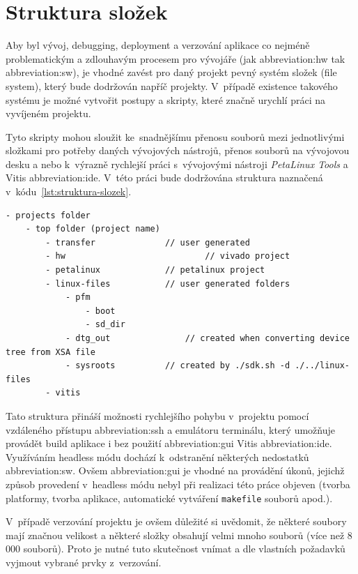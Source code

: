 \documentclass[a4paper, twoside, 11pt]{article}
\begin{document}
	\section{Struktura složek}\label{sec:struktura-slozek}
		Aby byl vývoj, debugging, deployment a verzování aplikace co nejméně problematickým a zdlouhavým procesem pro vývojáře (jak \gls{abbreviation:hw} tak \gls{abbreviation:sw}), je vhodné zavést pro daný projekt pevný systém složek (file system), který bude dodržován napříč projekty. V~případě existence takového systému je možné vytvořit postupy a skripty, které značně urychlí práci na vyvíjeném projektu.\par
		Tyto skripty mohou sloužit ke~snadnějšímu přenosu souborů mezi jednotlivými složkami pro potřeby daných vývojových nástrojů, přenos souborů na vývojovou desku a nebo k~výrazně rychlejší práci s~vývojovými nástroji \textit{PetaLinux Tools} a Vitis \gls{abbreviation:ide}.
		V~této práci bude dodržována struktura naznačená v~kódu~\ref{lst:struktura-slozek}.

		\begin{lstlisting}[language={Text}, caption={Struktura složek, využívaná při tvorbě projektů k~dosažení lepšího \gls{abbreviation:dx}.}, label= {lst:struktura-slozek}]
- projects folder
	- top folder (project name)
		- transfer				// user generated
		- hw							// vivado project
		- petalinux				// petalinux project
		- linux-files			// user generated folders
			- pfm
				- boot
				- sd_dir
			- dtg_out				// created when converting device tree from XSA file
			- sysroots			// created by ./sdk.sh -d ./../linux-files
		- vitis\end{lstlisting}

		Tato struktura přináší možnosti rychlejšího pohybu v~projektu pomocí vzdáleného přístupu \gls{abbreviation:ssh} a emulátoru terminálu, který umožňuje provádět build aplikace i bez použití \gls{abbreviation:gui} Vitis \gls{abbreviation:ide}. Využíváním headless módu dochází k~odstranění některých nedostatků \gls{abbreviation:sw}. Ovšem \gls{abbreviation:gui} je vhodné na provádění úkonů, jejichž způsob provedení v~headless módu nebyl při realizaci této práce objeven (tvorba platformy, tvorba aplikace, automatické vytváření \texttt{makefile} souborů apod.).\par
		V~případě verzování projektu je ovšem důležité si uvědomit, že některé soubory mají značnou velikost a některé složky obsahují velmi mnoho souborů (více než 8 000 souborů). Proto je nutné tuto skutečnost vnímat a dle vlastních požadavků vyjmout vybrané prvky z~verzování.
		
\end{document}
